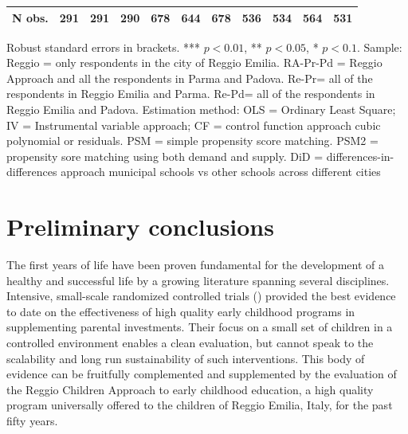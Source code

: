 \documentclass[12pt]{article}
\begin{document}
\begin{table}[ht]
\begin{center}
\begin{adjustbox}{width=1.2\textwidth,center=\textwidth}
\begin{tabular}{l*{10}{c}}
\hline
N obs. &  291 & 291 & 290 & 678 & 644 & 678 & 536 & 534 & 564 & 531 \\
\hline
\end{tabular}
\end{adjustbox}
\end{center}

\begin{footnotesize}
\raggedright{Robust standard errors in brackets. *** $p<0.01$, ** $p<0.05$, * $p<0.1$. Sample: Reggio = only respondents in the city of Reggio Emilia. RA-Pr-Pd = Reggio Approach and all the respondents in Parma and Padova. Re-Pr= all of the respondents in Reggio Emilia and Parma. Re-Pd= all of the respondents in Reggio Emilia and Padova. Estimation method: OLS = Ordinary Least Square; IV = Instrumental variable approach; CF = control function approach cubic polynomial or residuals. PSM = simple propensity score matching. PSM2 = propensity sore matching using both demand and supply. DiD = differences-in-differences approach municipal schools vs other schools across different cities}
\end{footnotesize}
\end{table}


\section{Preliminary conclusions} \label{sec:conclusion}

The first years of life have been proven fundamental for the development of a healthy and successful life by a growing literature spanning several disciplines. Intensive, small-scale randomized controlled trials (\cite{Heckman2013a,Campbell2014,Gertler2014}) provided the best evidence to date on the effectiveness of high quality early childhood programs in supplementing parental investments. Their focus on a small set of children in a controlled environment enables a clean evaluation, but cannot speak to the scalability and long run sustainability of such interventions. This body of evidence can be fruitfully complemented and supplemented by the evaluation of the Reggio Children Approach to early childhood education, a high quality program universally offered to the children of Reggio Emilia, Italy, for the past fifty years.
\end{document}
